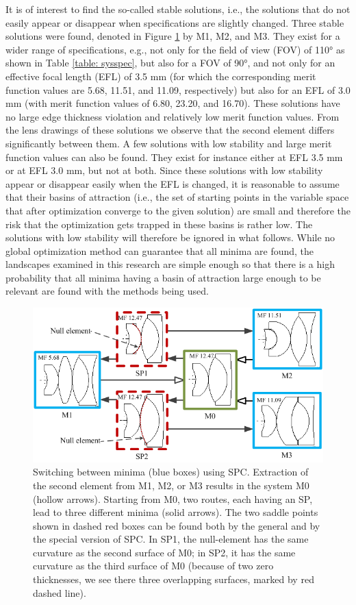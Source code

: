 It is of interest to find the so-called stable solutions, i.e., the solutions that do not easily appear or disappear when specifications are slightly changed. Three stable solutions were found, denoted in Figure \ref{fig:wideangleSwitch} by M1, M2, and M3. They exist for a wider range of specifications, e.g., not only for the field of view (FOV) of 110° as shown in Table \ref{table: sysspec}, but also for a FOV of 90°, and not only for an effective focal length (EFL) of 3.5 mm (for which the corresponding merit function values are 5.68, 11.51, and 11.09, respectively) but also for an EFL of 3.0 mm (with merit function values of 6.80, 23.20, and 16.70). These solutions have no large edge thickness violation and relatively low merit function values. From the lens drawings of these solutions we observe that the second element differs significantly between them. A few solutions with low stability and large merit function values can also be found. They exist for instance either at EFL 3.5 mm or at EFL 3.0 mm, but not at both. Since these solutions with low stability appear or disappear easily when the EFL is changed, it is reasonable to assume that their basins of attraction (i.e., the set of starting points in the variable space that after optimization converge to the given solution) are small and therefore the risk that the optimization gets trapped in these basins is rather low. The solutions with low stability will therefore be ignored in what follows. While no global optimization method can guarantee that all minima are found, the landscapes examined in this research are simple enough so that there is a high probability that all minima having a basin of attraction large enough to be relevant are found with the methods being used. 

\begin{figure}[h!]
    \centering
    \includegraphics[scale=0.6]{chapter-3/figures/WideAngleSwitch.png}
    \caption{Switching between minima (blue boxes) using SPC. Extraction of the second element from M1, M2, or M3 results in the system M0 (hollow arrows). Starting from M0, two routes, each having an SP, lead to three different minima (solid arrows). The two saddle points shown in dashed red boxes can be found both by the general and by the special version of SPC. In SP1, the null-element has the same curvature as the second surface of M0; in SP2, it has the same curvature as the third surface of M0 (because of two zero thicknesses, we see there three overlapping surfaces, marked by red dashed line).}
    \label{fig:wideangleSwitch}
\end{figure}

